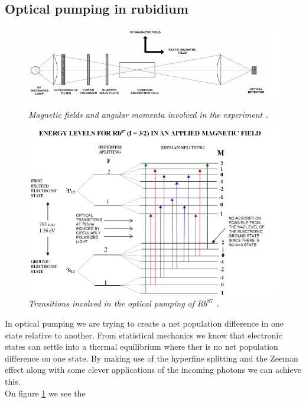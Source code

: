 \documentclass[twocolumn]{article}
\begin{document}
\subsection{Optical pumping in rubidium}
\begin{figure}
\begin{minipage}[t]{\textwidth}
\includegraphics[width=\linewidth]{pictures/rough-apparatus.png}
\caption{\textit{Magnetic fields and angular momenta involved in the experiment
\cite{ref:3}.}}
\label{fig:9}
\end{minipage}
\vfill
\begin{minipage}[t]{\textwidth}
\includegraphics[width=\linewidth]{pictures/energy-lev-trans.png}
\caption{\textit{Transitions involved in the optical pumping of $Rb^{87}$ 
\cite{ref:3}.}}
\label{fig:10}
\end{minipage}
\end{figure}
In optical pumping we are trying to create a net population 
difference in one state relative to another. From statistical mechanics we know 
that electronic states can settle into a thermal equilibrium where ther is no 
net population difference on one state. By making use of the hyperfine 
splitting and the Zeeman effect along with some clever applications of the 
incoming photons we can achieve this.
\\
On figure \ref{fig:10} we see the 
\end{document}
